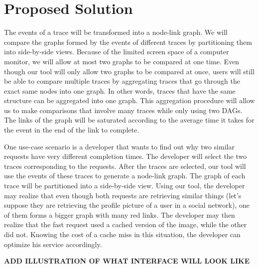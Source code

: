 \section{Proposed Solution}

The events of a trace will be transformed into a node-link graph. We will compare the graphs formed by the events of different traces
by partitioning them into side-by-side views. Because of the limited screen space of a computer monitor, we will allow at most two
graphs to be compared at one time. Even though our tool will only allow two graphs to be compared at once, users will still be able
to compare multiple traces by aggregating traces that go through the exact same nodes into one graph. In other words, traces that have
the same structure can be aggregated into one graph. This aggregation procedure will allow us to make comparisons that involve many
traces while only using two DAGs. The links of the graph will be saturated according to the average time it takes for the event in
the end of the link to complete.

One use-case scenario is a developer that wants to find out why two similar requests have very different completion times. The developer
will select the two traces corresponding to the requests. After the traces are selected, our tool will use the events of these traces
to generate a node-link graph. The graph of each trace will be partitioned into a side-by-side view. Using our tool, the developer may
realize that even though both requests are retrieving similar things (let's suppose they are retrieving the profile picture of a user in 
a social network), one of them forms a bigger graph with many red links. The developer may then realize that the fast request used a cached
version of the image, while the other did not. Knowing the cost of a cache miss in this situation, the developer can optimize his service
accordingly. 

\textbf{ADD ILLUSTRATION OF WHAT INTERFACE WILL LOOK LIKE}